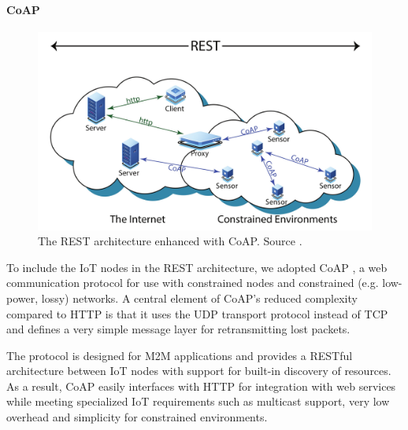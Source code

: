 \paragraph{CoAP}

\begin{figure}[ht]
\centering
\includegraphics[width=\columnwidth]{figures/coap}
\caption{The REST architecture enhanced with CoAP. Source \cite{bormann2012coap}.}
\label{fig:coap}
\end{figure}

To include the IoT nodes in the REST architecture, we adopted CoAP \cite{bormann2012coap}, a web communication protocol for use with constrained nodes and constrained (e.g. low-power, lossy) networks. A central element of CoAP's reduced complexity compared to HTTP is that it uses the UDP transport protocol instead of TCP and defines a very simple message layer for retransmitting lost packets.

The protocol is designed for M2M applications and provides a RESTful architecture between IoT nodes with support for built-in discovery of resources. As a result, CoAP easily interfaces with HTTP for integration with web services while meeting specialized IoT requirements such as multicast support, very low overhead and simplicity for constrained environments. 


